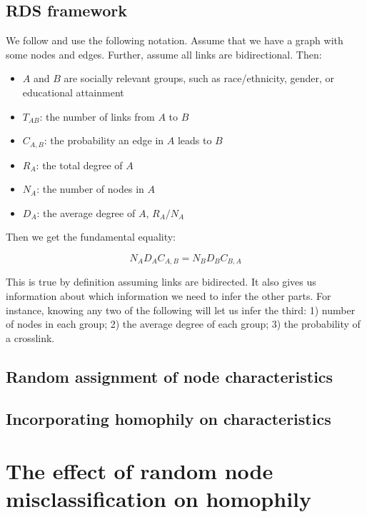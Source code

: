 \documentclass[a4paper]{article}
\begin{document}
\subsection{RDS framework}

We follow \cite{Salganik2004} and use the following notation. Assume that we have a graph with some nodes and edges. Further, assume all links are bidirectional. Then:

\begin{itemize}
\item $A$ and $B$ are socially relevant groups, such as race/ethnicity, gender, or educational attainment
\item $T_{AB}$: the number of links from $A$ to $B$
\item $C_{A,B}$: the probability an edge in $A$ leads to $B$
\item $R_A$: the total degree of $A$
\item $N_A$: the number of nodes in $A$
\item $D_A$: the average degree of $A$, $R_A / N_A$
\end{itemize}

Then we get the fundamental equality:

\begin{equation}
N_A D_A C_{A,B} = N_B D_B C_{B,A}
\end{equation}

This is true by definition assuming links are bidirected. It also gives us information about which information we need to infer the other parts. For instance, knowing any two of the following will let us infer the third: 1) number of nodes in each group; 2) the average degree of each group; 3) the probability of a crosslink.



\subsection{Random assignment of node characteristics}

\subsection{Incorporating homophily on characteristics}


\section{The effect of random node misclassification on homophily}
\end{document}
